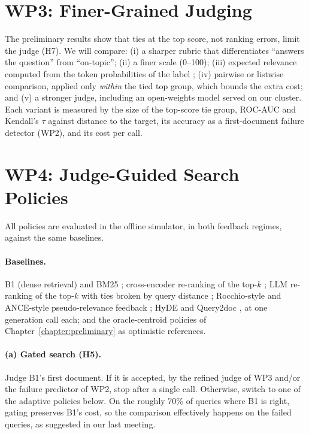\section{WP3: Finer-Grained Judging}

The preliminary results show that ties at the top score, not ranking errors, limit the judge (H7). We will compare: (i) a sharper rubric that differentiates ``answers the question'' from ``on-topic''; (ii) a finer scale (0--100); (iii) expected relevance computed from the token probabilities of the label \citep{zhuang2024beyond}; (iv) pairwise or listwise comparison, applied only \emph{within} the tied top group, which bounds the extra cost; and (v) a stronger judge, including an open-weights model served on our cluster. Each variant is measured by the size of the top-score tie group, ROC-AUC and Kendall's $\tau$ against distance to the target, its accuracy as a first-document failure detector (WP2), and its cost per call.

\section{WP4: Judge-Guided Search Policies}

All policies are evaluated in the offline simulator, in both feedback regimes, against the same baselines.

\paragraph{Baselines.}
B1 (dense retrieval) and BM25 \citep{robertson2009bm25}; cross-encoder re-ranking of the top-$k$ \citep{nogueira2019passage}; LLM re-ranking of the top-$k$ with ties broken by query distance \citep{sun2023rankgpt}; Rocchio-style and ANCE-style pseudo-relevance feedback \citep{rocchio1971relevance,yu2021anceprf}; HyDE and Query2doc \citep{gao2023hyde,wang2023query2doc}, at one generation call each; and the oracle-centroid policies of Chapter~\ref{chapter:preliminary} as optimistic references.

\paragraph{(a) Gated search (H5).}
Judge B1's first document. If it is accepted, by the refined judge of WP3 and/or the failure predictor of WP2, stop after a single call. Otherwise, switch to one of the adaptive policies below. On the roughly 70\% of queries where B1 is right, gating preserves B1's cost, so the comparison effectively happens on the failed queries, as suggested in our last meeting.

